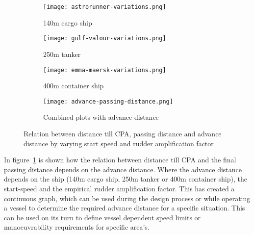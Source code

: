 \begin{figure}[!p]
	\centering
	\begin{subfigure}[b]{0.32\textwidth}
		\texttt{[image: astrorunner-variations.png]} 
		\caption{140m cargo ship} 
	\end{subfigure}
	\begin{subfigure}[b]{0.32\linewidth}
		\texttt{[image: gulf-valour-variations.png]} 
		\caption{250m tanker} 
	\end{subfigure}
	\begin{subfigure}[b]{0.32\textwidth}
		\texttt{[image: emma-maersk-variations.png]} 
		\caption{400m container ship} 
	\end{subfigure}

	\begin{subfigure}[b]{.9	\textwidth}
		\texttt{[image: advance-passing-distance.png]}
		\caption{Combined plots with advance distance}
		\label{fig:passing-distance-advance}
	\end{subfigure}
	\caption{Relation between distance till CPA, passing distance and advance distance by varying start speed and rudder amplification factor} 
	\label{fig:result-advance-distance} 
\end{figure}

In figure~\ref{fig:passing-distance-advance} is shown how the relation between distance till CPA and the final passing distance depends on the advance distance. Where the advance distance depends on the ship (140m cargo ship, 250m tanker or 400m container ship), the start-speed and the empirical rudder amplification factor. This has created a continuous graph, which can be used during the design process or while operating a vessel to determine the required advance distance for a specific situation. This can be used on its turn to define vessel dependent speed limits or manoeuvrability requirements for specific area's.
